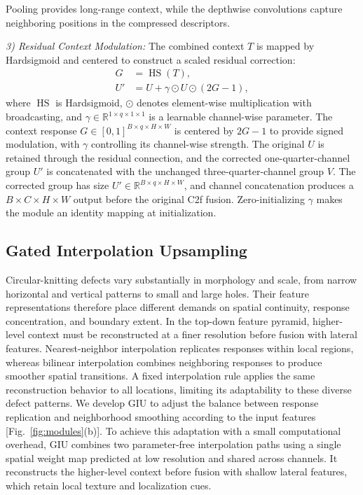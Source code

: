 \documentclass[a4paper,fleqn]{cas-dc}
\begin{document}
Pooling provides long-range context, while the depthwise convolutions capture neighboring positions in the compressed descriptors.

\emph{3) Residual Context Modulation:}
The combined context $T$ is mapped by Hardsigmoid and centered to construct a scaled residual correction:
\begin{align}
G &= \operatorname{HS}(T), \label{eq:pac-map}\\
U' &= U+\gamma\odot U\odot(2G-1), \label{eq:pac-modulation}
\end{align}
\noindent where $\operatorname{HS}$ is Hardsigmoid, $\odot$ denotes element-wise multiplication with broadcasting, and $\gamma\in\mathbb{R}^{1\times q\times1\times1}$ is a learnable channel-wise parameter. The context response $G\in[0,1]^{B\times q\times H\times W}$ is centered by $2G-1$ to provide signed modulation, with $\gamma$ controlling its channel-wise strength. The original $U$ is retained through the residual connection, and the corrected one-quarter-channel group $U'$ is concatenated with the unchanged three-quarter-channel group $V$. The corrected group has size $U'\in\mathbb{R}^{B\times q\times H\times W}$, and channel concatenation produces a $B\times C\times H\times W$ output before the original C2f fusion. Zero-initializing $\gamma$ makes the module an identity mapping at initialization.

\subsection{Gated Interpolation Upsampling}
Circular-knitting defects vary substantially in morphology and scale, from narrow horizontal and vertical patterns to small and large holes. Their feature representations therefore place different demands on spatial continuity, response concentration, and boundary extent. In the top-down feature pyramid, higher-level context must be reconstructed at a finer resolution before fusion with lateral features. Nearest-neighbor interpolation replicates responses within local regions, whereas bilinear interpolation combines neighboring responses to produce smoother spatial transitions. A fixed interpolation rule applies the same reconstruction behavior to all locations, limiting its adaptability to these diverse defect patterns. We develop GIU to adjust the balance between response replication and neighborhood smoothing according to the input features [Fig.~\ref{fig:modules}(b)]. To achieve this adaptation with a small computational overhead, GIU combines two parameter-free interpolation paths using a single spatial weight map predicted at low resolution and shared across channels. It reconstructs the higher-level context before fusion with shallow lateral features, which retain local texture and localization cues.
\end{document}
